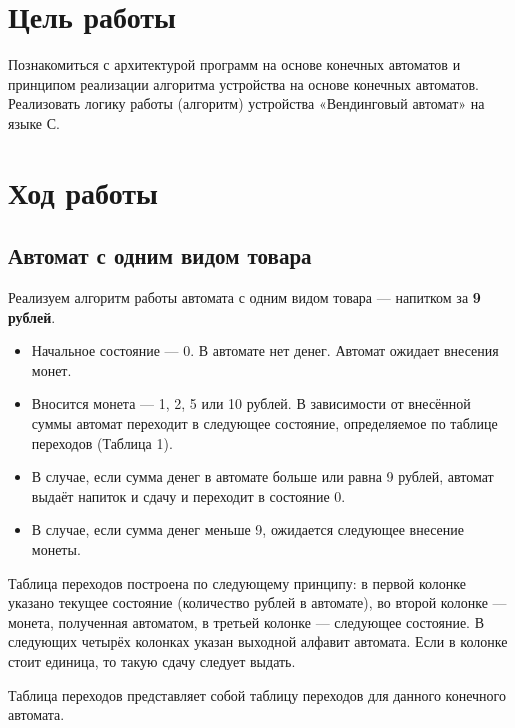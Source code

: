 \section{Цель работы}
Познакомиться с архитектурой программ на основе конечных автоматов и принципом реализации алгоритма устройства на основе конечных автоматов. Реализовать логику работы (алгоритм) устройства «Вендинговый автомат» на языке С.



\section{Ход работы}

\subsection{Автомат с одним видом товара}

Реализуем алгоритм работы автомата с одним видом товара — напитком за \textbf{9 рублей}.
\begin{itemize}
    \item Начальное состояние — 0. В автомате нет денег. Автомат ожидает внесения монет.
    \item Вносится монета — 1, 2, 5 или 10 рублей. В зависимости от внесённой суммы автомат переходит в следующее состояние, определяемое по таблице переходов (Таблица 1).
    \item В случае, если сумма денег в автомате больше или равна 9 рублей, автомат выдаёт напиток и сдачу и переходит в состояние 0.
    \item В случае, если сумма денег меньше 9, ожидается следующее внесение монеты.
\end{itemize}

Таблица переходов построена по следующему принципу: в первой колонке указано текущее состояние (количество рублей в автомате), во второй колонке — монета, полученная автоматом, в третьей колонке — следующее состояние. В следующих четырёх колонках указан выходной алфавит автомата. Если в колонке стоит единица, то такую сдачу следует выдать.

Таблица переходов представляет собой таблицу переходов для данного конечного автомата.

